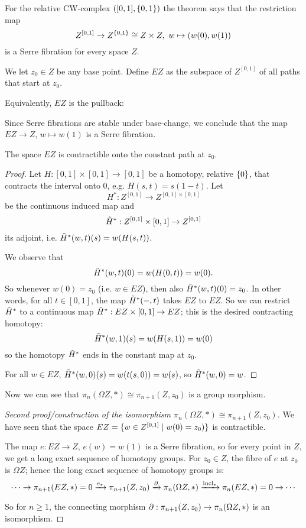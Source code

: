 For the relative CW-complex $([0,1],\{0,1\})$ the theorem says that the restriction map
\[Z^{[0,1]}\to Z^{\{0,1\}}\cong Z\times Z,\ w\mapsto (w(0),w(1))\]
is a Serre fibration for every space $Z$.

We let $z_0\in Z$ be any base point. Define $EZ$ as the subspace of $Z^{[0,1]}$ of all paths that start at $z_0$.

Equivalently, $EZ$ is the pullback:
\begin{center}
\end{center}

Since Serre fibrations are stable under base-change, we conclude that the map $EZ\to Z$, $w\mapsto w(1)$ is a Serre fibration.

\begin{theorem}\label{theorem:EZ-contractible}
The space $EZ$ is contractible onto the constant path at $z_0$.
\end{theorem}

\begin{proof}
Let $H:[0,1]\times[0,1]\to[0,1]$ be a homotopy, relative $\{0\}$, that contracts the interval onto $0$, e.g. $H(s,t)=s(1-t)$. Let
\[H^*:Z^{[0,1]}\to Z^{[0,1]\times[0,1]}\]
be the continuous induced map and
\[\tilde H^*:Z^{[0,1]}\times[0,1]\to Z^{[0,1]}\]
its adjoint, i.e. $\tilde H^*(w,t)(s)=w(H(s,t))$.

We observe that
\[\tilde H^*(w,t)(0)=w(H(0,t))=w(0).\]
So whenever $w(0)=z_0$ (i.e. $w\in EZ$), then also $\tilde H^*(w,t)(0)=z_0$. In other words, for all $t\in[0,1]$, the map $\tilde H^*(-,t)$ takes $EZ$ to $EZ$. So we can restrict $\tilde H^*$ to a continuous map $\tilde H^*:EZ\times[0,1]\to EZ$; this is the desired contracting homotopy:
\[\tilde H^*(w,1)(s)=w(H(s,1))=w(0)\]
so the homotopy $\tilde H^*$ ends in the constant map at $z_0$.

For all $w\in EZ$, $\tilde H^*(w,0)(s)=w(t(s,0))=w(s)$, so $\tilde H^*(w,0)=w$.
\end{proof}

Now we can see that $\pi_n(\Omega Z,*)\cong\pi_{n+1}(Z,z_0)$ is a group morphism.

\begin{proof}[Second proof/construction of the isomorphism $\pi_n(\Omega Z,*)\cong\pi_{n+1}(Z,z_0)$]

We have seen that the space $EZ=\{w\in Z^{[0,1]}\mid w(0)=z_0)\}$ is contractible.

The map $e:EZ\to Z$, $e(w)=w(1)$ is a Serre fibration, so for every point in $Z$, we get a long exact sequence of homotopy groups. For $z_0\in Z$, the fibre of $e$ at $z_0$ is $\Omega Z$; hence the long exact sequence of homotopy groups is:
\[\dots\to\pi_{n+1}(EZ,*)=0\xrightarrow{e_*}\pi_{n+1}(Z,z_0)\xrightarrow{\partial}\pi_n(\Omega Z,*)\xrightarrow{\operatorname{incl}_*}\pi_n(EZ,*)=0\to\cdots\]

So for $n\geq 1$, the connecting morphism $\partial:\pi_{n+1}(Z,z_0)\to\pi_n(\Omega Z,*)$ is an isomorphism.
\end{proof}

